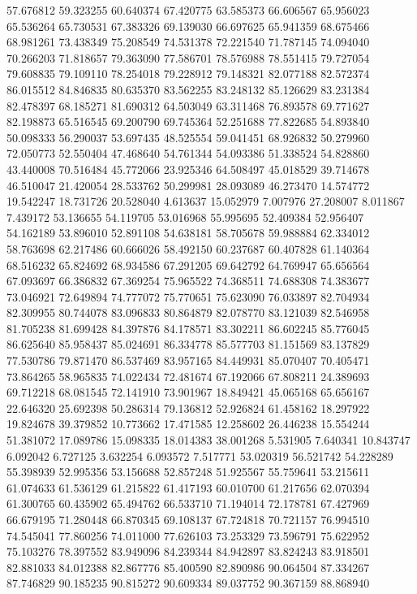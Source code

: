 57.676812
59.323255
60.640374
67.420775
63.585373
66.606567
65.956023
65.536264
65.730531
67.383326
69.139030
66.697625
65.941359
68.675466
68.981261
73.438349
75.208549
74.531378
72.221540
71.787145
74.094040
70.266203
71.818657
79.363090
77.586701
78.576988
78.551415
79.727054
79.608835
79.109110
78.254018
79.228912
79.148321
82.077188
82.572374
86.015512
84.846835
80.635370
83.562255
83.248132
85.126629
83.231384
82.478397
68.185271
81.690312
64.503049
63.311468
76.893578
69.771627
82.198873
65.516545
69.200790
69.745364
52.251688
77.822685
54.893840
50.098333
56.290037
53.697435
48.525554
59.041451
68.926832
50.279960
72.050773
52.550404
47.468640
54.761344
54.093386
51.338524
54.828860
43.440008
70.516484
45.772066
23.925346
64.508497
45.018529
39.714678
46.510047
21.420054
28.533762
50.299981
28.093089
46.273470
14.574772
19.542247
18.731726
20.528040
4.613637
15.052979
7.007976
27.208007
8.011867
7.439172
53.136655
54.119705
53.016968
55.995695
52.409384
52.956407
54.162189
53.896010
52.891108
54.638181
58.705678
59.988884
62.334012
58.763698
62.217486
60.666026
58.492150
60.237687
60.407828
61.140364
68.516232
65.824692
68.934586
67.291205
69.642792
64.769947
65.656564
67.093697
66.386832
67.369254
75.965522
74.368511
74.688308
74.383677
73.046921
72.649894
74.777072
75.770651
75.623090
76.033897
82.704934
82.309955
80.744078
83.096833
80.864879
82.078770
83.121039
82.546958
81.705238
81.699428
84.397876
84.178571
83.302211
86.602245
85.776045
86.625640
85.958437
85.024691
86.334778
85.577703
81.151569
83.137829
77.530786
79.871470
86.537469
83.957165
84.449931
85.070407
70.405471
73.864265
58.965835
74.022434
72.481674
67.192066
67.808211
24.389693
69.712218
68.081545
72.141910
73.901967
18.849421
45.065168
65.656167
22.646320
25.692398
50.286314
79.136812
52.926824
61.458162
18.297922
19.824678
39.379852
10.773662
17.471585
12.258602
26.446238
15.554244
51.381072
17.089786
15.098335
18.014383
38.001268
5.531905
7.640341
10.843747
6.092042
6.727125
3.632254
6.093572
7.517771
53.020319
56.521742
54.228289
55.398939
52.995356
53.156688
52.857248
51.925567
55.759641
53.215611
61.074633
61.536129
61.215822
61.417193
60.010700
61.217656
62.070394
61.300765
60.435902
65.494762
66.533710
71.194014
72.178781
67.427969
66.679195
71.280448
66.870345
69.108137
67.724818
70.721157
76.994510
74.545041
77.860256
74.011000
77.626103
73.253329
73.596791
75.622952
75.103276
78.397552
83.949096
84.239344
84.942897
83.824243
83.918501
82.881033
84.012388
82.867776
85.400590
82.890986
90.064504
87.334267
87.746829
90.185235
90.815272
90.609334
89.037752
90.367159
88.868940
